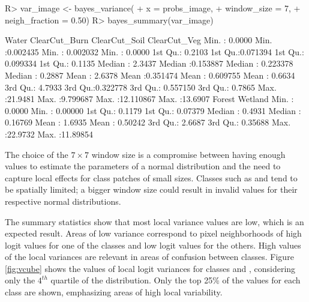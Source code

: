 \documentclass[
  shortnames]{jss}
\begin{document}
\begin{CodeChunk}
\begin{CodeInput}
R> var_image <- bayes_variance(
+     x = probs_image,
+     window_size = 7,
+     neigh_fraction = 0.50)
R> bayes_summary(var_image)
\end{CodeInput}
\begin{CodeOutput}
 Water             ClearCut_Burn      ClearCut_Soil       ClearCut_Veg     
 Min.   : 0.0000   Min.   :0.002435   Min.   : 0.002032   Min.   : 0.0000  
 1st Qu.: 0.2103   1st Qu.:0.071394   1st Qu.: 0.099334   1st Qu.: 0.1135  
 Median : 2.3437   Median :0.153887   Median : 0.223378   Median : 0.2887  
 Mean   : 2.6378   Mean   :0.351474   Mean   : 0.609755   Mean   : 0.6634  
 3rd Qu.: 4.7933   3rd Qu.:0.322778   3rd Qu.: 0.557150   3rd Qu.: 0.7865  
 Max.   :21.9481   Max.   :9.799687   Max.   :12.110867   Max.   :13.6907  
 Forest            Wetland           
 Min.   : 0.0000   Min.   : 0.00000  
 1st Qu.: 0.1179   1st Qu.: 0.07379  
 Median : 0.4931   Median : 0.16769  
 Mean   : 1.6935   Mean   : 0.50242  
 3rd Qu.: 2.6687   3rd Qu.: 0.35688  
 Max.   :22.9732   Max.   :11.89854  
\end{CodeOutput}
\end{CodeChunk}

The choice of the \(7 \times 7\) window size is a compromise between having enough values to estimate the parameters of a normal distribution and the need to capture local effects for class patches of small sizes. Classes such as  and  tend to be spatially limited; a bigger window size could result in invalid values for their respective normal distributions.

The summary statistics show that most local variance values are low, which is an expected result. Areas of low variance correspond to pixel neighborhoods of high logit values for one of the classes and low logit values for the others. High values of the local variances are relevant in areas of confusion between classes. Figure \ref{fig:vcube} shows the values of local logit variances for classes  and , considering only the \(4^{th}\) quartile of the distribution. Only the top 25\% of the values for each class are shown, emphasizing areas of high local variability.
\end{document}
